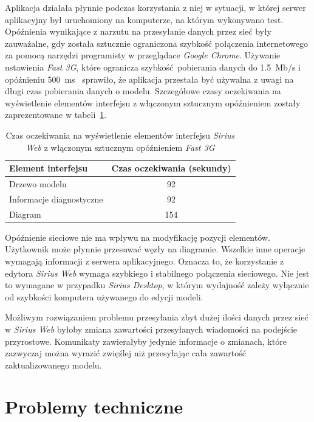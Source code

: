 Aplikacja działała płynnie podczas korzystania z niej w sytuacji, w której
serwer aplikacyjny był uruchomiony na komputerze, na którym wykonywano test.
Opóźnienia wynikające z narzutu na przesyłanie danych przez sieć były
zauważalne, gdy została sztucznie ograniczona szybkość połączenia internetowego
za pomocą narzędzi programisty w przeglądace \emph{Google Chrome}.
Używanie ustawienia \emph{Fast 3G}, które ogranicza szybkość pobierania danych
do 1.5~Mb/s i opóźnieniu
500~ms~\cite{network-throttling-profiles-stackoverflow} sprawiło, że aplikacja
przestała być używalna z uwagi na długi czas pobierania danych o modelu.
Szczegółowe czasy oczekiwania na wyświetlenie elementów interfejsu z włączonym
sztucznym opóźnieniem zostały zaprezentowane w
tabeli~\ref{tab:sirius-web-ui-delay-throttled}.

\begin{table}[!b]
	\centering
	\begin{tabular}{p{5cm}c}
		\toprule
		Element interfejsu       & Czas oczekiwania (sekundy) \\
		\midrule
		Drzewo modelu            & 92                         \\
		Informacje diagnostyczne & 92                         \\
		Diagram                  & 154                        \\
		\bottomrule
	\end{tabular}
	\caption{Czas oczekiwania na wyświetlenie elementów interfejsu
		\emph{Sirius
			Web} z włączonym sztucznym opóźnieniem \emph{Fast
			3G}}\label{tab:sirius-web-ui-delay-throttled}
\end{table}

Opóźnienie sieciowe nie ma wpływu na modyfikację pozycji elementów. Użytkownik
może płynnie przesuwać węzły na diagramie. Wszelkie inne operacje wymagają
informacji z serwera aplikacyjnego. Oznacza to, że korzystanie z edytora
\emph{Sirius Web} wymaga szybkiego i stabilnego połączenia sieciowego. Nie jest
to wymagane w przypadku \emph{Sirius Desktop}, w którym wydajność zależy
wyłącznie od szybkości komputera używanego do edycji modeli.

Możliwym rozwiązaniem problemu przesyłania zbyt dużej ilości danych przez sieć
w \emph{Sirius Web} byłoby zmiana zawartości przesyłanych wiadomości na
podejście przyrostowe. Komunikaty zawierałyby jedynie informacje o zmianach,
które zazwyczaj można wyrazić zwięźlej niż przesyłając cała zawartość
zaktualizowanego modelu.

\section{Problemy techniczne}

